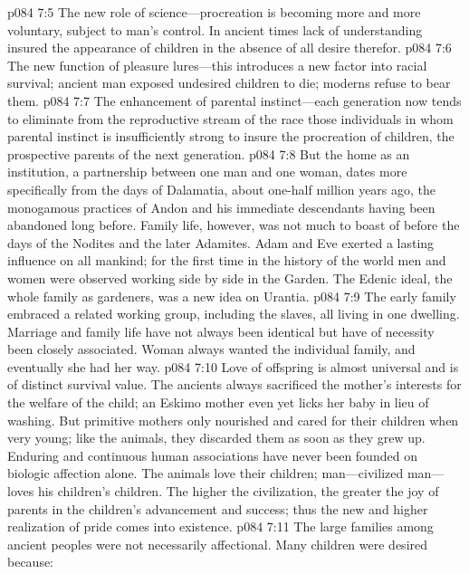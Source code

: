 \pc \vs p084 7:5 \bibnobreakspace The new role of science---procreation is becoming more and more voluntary, subject to man’s control. In ancient times lack of understanding insured the appearance of children in the absence of all desire therefor.
\pc \vs p084 7:6 \bibnobreakspace The new function of pleasure lures---this introduces a new factor into racial survival; ancient man exposed undesired children to die; moderns refuse to bear them.
\pc \vs p084 7:7 \bibnobreakspace The enhancement of parental in\-stinct---each generation now tends to eliminate from the reproductive stream of the race those individuals in whom parental instinct is insufficiently strong to insure the procreation of children, the prospective parents of the next generation.
\pc \vs p084 7:8 But the home as an institution, a partnership between one man and one woman, dates more specifically from the days of Dalamatia, about one\hyp{}half million years ago, the monogamous practices of Andon and his immediate descendants having been abandoned long before. Family life, however, was not much to boast of before the days of the Nodites and the later Adamites. Adam and Eve exerted a lasting influence on all mankind; for the first time in the history of the world men and women were observed working side by side in the Garden. The Edenic ideal, the whole family as gardeners, was a new idea on Urantia.\plusone
\vs p084 7:9 The early family embraced a related working group, including the slaves, all living in one dwelling. Marriage and family life have not always been identical but have of necessity been closely associated. Woman always wanted the individual family, and eventually she had her way.
\pc \vs p084 7:10 Love of offspring is almost universal and is of distinct survival value. The ancients always sacrificed the mother’s interests for the welfare of the child; an Eskimo mother even yet licks her baby in lieu of washing. But primitive mothers only nourished and cared for their children when very young; like the animals, they discarded them as soon as they grew up. Enduring and continuous human associations have never been founded on biologic affection alone. The animals love their children; man---civilized man---loves his children’s children. The higher the civilization, the greater the joy of parents in the children’s advancement and success; thus the new and higher realization of  pride comes into existence.
\vs p084 7:11 The large families among ancient peoples were not necessarily affectional. Many children were desired because:
